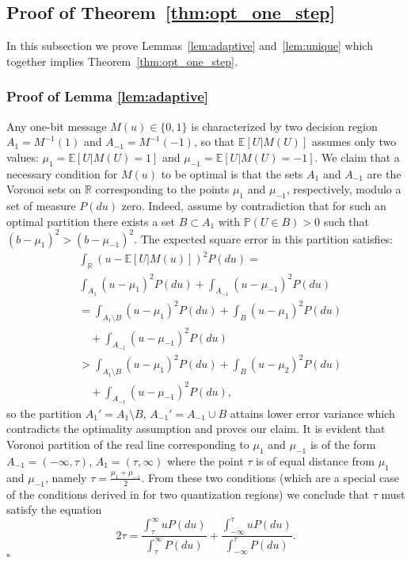 \documentclass[letterpaper, 11pt]{IEEEtran}      %
\newcommand*{\QEDA}{\hfill\ensuremath{\square}}
\begin{document}
\subsection*{Proof of Theorem~\ref{thm:opt_one_step}}
In this subsection we prove Lemmas~\ref{lem:adaptive} and~\ref{lem:unique} which together implies Theorem~\ref{thm:opt_one_step}. 

\subsubsection*{Proof of Lemma \ref{lem:adaptive}}
Any one-bit message $M(u) \in \{0,1\}$ is characterized by two decision region $A_1 = M^{-1}(1)$ and $A_{-1} = M^{-1}(-1)$, so that $\mathbb E \left[ U | M(U) \right]$ assumes only two values: $\mu_1 = \mathbb E \left[ U | M(U) = 1 \right]$ and $\mu_{-1} = \mathbb E \left[ U | M(U) = -1 \right]$. We claim that a necessary condition for $M(u)$ to be optimal is that the sets $A_1$ and $A_{-1}$ are the Voronoi sets on $\mathbb R$ corresponding to the points $\mu_1$ and $\mu_{-1}$, respectively, modulo a set of measure $P(du)$ zero. Indeed, assume by contradiction that for such an optimal partition there exists a set $B \subset A_{1}$ with $\mathbb P (U \in B) >0$ such that $\left( b-\mu_{1} \right)^2 > \left( b- \mu_{-1} \right)^2$. The expected square error in this partition satisfies:
\begin{align*}
& \int_{\mathbb R} \left( u - \mathbb E[U|M(u)]  \right)^2 P(du) =  \\
& \int_{A_1} (u- \mu_1)^2 P(du) + \int_{A_{-1}} (u- \mu_{-1})^2 P(du) \\
& = \int_{A_1\setminus B} (u- \mu_1)^2 P(du) +  \int_{B} (u- \mu_1)^2 P(du) \\
& \quad + \int_{A_{-1}} (u- \mu_{-1})^2 P(du) \\
& > \int_{A_1\setminus B} (u- \mu_1)^2 P(du) +  \int_{B} (u- \mu_2)^2 P(du) \\
& \quad + \int_{A_{-1}} (u- \mu_{-1})^2 P(du),
\end{align*}
so the partition $A_1' = A_1 \setminus B$, $A_{-1}' = A_{-1} \cup B$ attains lower error variance which contradicts the optimality assumption and proves our claim. It is evident that Voronoi partition of the real line corresponding to $\mu_1$ and $\mu_{-1}$ is of the form $A_{-1} = (-\infty,\tau)$, $A_{1} = (\tau, \infty)$ where the point $\tau$ is of equal distance from $\mu_1$ and $\mu_{-1}$, namely $\tau = \frac{\mu_1 + \mu_{-1}}{2}$. From these two conditions (which are a special case of the conditions derived in \cite{1056489} for two quantization regions) we conclude that $\tau$ must satisfy the equation
\[
2 \tau = \frac{\int_{\tau}^\infty u P(du)}{\int_{\tau}^\infty P(du)} + \frac{\int_{-\infty}^{\tau} u P(du)}{\int_{-\infty}^{\tau} P(du)}.
\] 
\QEDA
\end{document}
